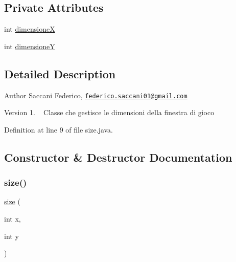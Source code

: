 \subsection*{Private Attributes}
\begin{DoxyCompactItemize}
\item 
int \mbox{\hyperlink{class_snake_1_1gui_1_1size_a0bdeac13931981470cd6efb046fa159e}{dimensioneX}}
\item 
int \mbox{\hyperlink{class_snake_1_1gui_1_1size_aac148f9dd42d2e927b0ae441ad2f6a41}{dimensioneY}}
\end{DoxyCompactItemize}


\subsection{Detailed Description}
\begin{DoxyAuthor}{Author}
Saccani Federico, \href{mailto:federico.saccani01@gmail.com}{\tt federico.\+saccani01@gmail.\+com} 
\end{DoxyAuthor}
\begin{DoxyVersion}{Version}
1. ~\newline
Classe che gestisce le dimensioni della finestra di gioco 
\end{DoxyVersion}


Definition at line 9 of file size.\+java.



\subsection{Constructor \& Destructor Documentation}
\mbox{\label{class_snake_1_1gui_1_1size_a7c4658f39544b40f6effd803b0751dec}} 
\subsubsection{\texorpdfstring{size()}{size()}\hspace{0.1cm}{\footnotesize\ttfamily [1/2]}}
{\footnotesize\ttfamily \mbox{\hyperlink{class_snake_1_1gui_1_1size}{size}} (\begin{DoxyParamCaption}\item[{int}]{x,  }\item[{int}]{y }\end{DoxyParamCaption})}



